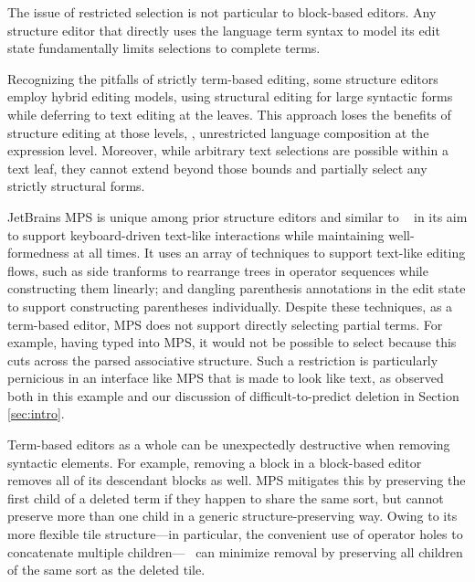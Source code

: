 The issue of restricted selection is not particular to
block-based editors.
Any structure editor that directly uses the
language term syntax to model
its edit state fundamentally limits selections to complete
terms.


Recognizing the pitfalls of strictly term-based
editing, some structure editors
\cite{Cornell,greenfoot}
employ hybrid editing models, using structural editing
for large syntactic forms while deferring to text
editing at the leaves.
This approach loses the benefits of structure editing
at those levels, \eg, unrestricted language composition
at the expression level.
Moreover, while arbitrary text selections are possible
within a text leaf, they cannot extend beyond those
bounds and partially select any strictly structural forms.

JetBrains MPS \cite{DBLP:conf/icse/VoelterP12} is unique
among prior structure editors and similar to \tylr~ in
its aim to support keyboard-driven text-like interactions while
maintaining well-formedness at all times.
It uses an array of techniques to support text-like
editing flows, such as side tranforms to rearrange
trees in operator sequences while constructing them
linearly; and dangling parenthesis annotations in the
edit state to support constructing parentheses individually.
Despite these techniques, as a term-based editor, MPS
does not support directly selecting partial terms.
For example, having typed  into MPS, it would
not be possible to select  because this cuts
across the parsed associative structure.
Such a restriction is particularly pernicious in
an interface like MPS that is made to look like text, as observed
both in this example and our discussion of
difficult-to-predict deletion in Section \ref{sec:intro}.

Term-based editors as a whole can be unexpectedly
destructive when removing syntactic elements.
For example, removing a block in a block-based editor
removes all of its descendant blocks as well.
MPS mitigates this by preserving the first child of a deleted term
if they happen to share the same sort,
but cannot preserve more than one child in a generic
structure-preserving way.
Owing to its more flexible tile structure---in particular,
the convenient use of operator holes to concatenate
multiple children---\tylr~ can minimize removal
by preserving all children of the
same sort as the deleted tile.

